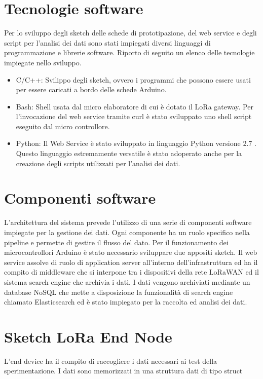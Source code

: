 \documentclass[12pt,a4paper,openright,twoside]{report}
\begin{document}
\section{Tecnologie software}
Per lo sviluppo degli sketch delle schede di prototipazione, del web service e degli script per l'analisi dei dati sono stati impiegati diversi linguaggi di programmazione e librerie software. Riporto di seguito un elenco delle tecnologie impiegate nello sviluppo.
\begin{itemize}
    \item C/C++: Svilippo degli sketch, ovvero i programmi che possono essere usati per essere caricati a bordo delle schede Arduino. 
    \item Bash: Shell usata dal micro elaboratore di cui \`e dotato il LoRa gateway. Per l'invocazione del web service tramite curl \`e stato sviluppato uno shell script eseguito dal micro controllore.
    \item Python: Il Web Service \`e stato sviluppato in linguaggio Python versione 2.7 . Questo linguaggio estremamente versatile \`e stato adoperato anche per la creazione degli scripts utilizzati per l'analisi dei dati.
\end{itemize}



\section{Componenti software}
L'architettura del sistema prevede l'utilizzo di una serie di componenti software impiegate per la gestione dei dati. Ogni componente ha un ruolo specifico nella pipeline e permette di gestire il flusso del dato. Per il funzionamento dei microcontrollori Arduino \`e stato necessario sviluppare due appositi sketch. Il web service assolve di ruolo di application server all'interno dell'infrastruttura ed ha il compito di middleware che si interpone tra i dispositivi della rete LoRaWAN ed il sistema search engine che archivia i dati.
I dati vengono  archiviati mediante un database NoSQL che mette a disposizione la funzionalit\`a di search engine chiamato Elasticsearch ed \`e stato impiegato per la raccolta ed analisi dei dati.  

\section{Sketch LoRa End Node}
L'end device ha il compito di raccogliere i dati necessari ai test della sperimentazione. I dati sono memorizzati in una struttura dati di tipo struct
\end{document}
